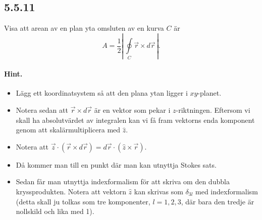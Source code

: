 \documentclass[%
oneside,                 %
final,                   %
10pt]{article}
\newenvironment{doconceexercise}{}{}
\newcounter{doconceexercisecounter}
\begin{document}
\begin{doconceexercise}

\subsection{5.5.11}

Visa att arean av en plan yta omsluten av en kurva $C$ är
\begin{equation*}
A=\frac{1}{2} \left| \,\oint\limits_C\vec{r}\times d\vec{r}\, \right|.
\end{equation*}


\paragraph{Hint.}
\begin{itemize}
\item Lägg ett koordinatsystem så att den plana ytan ligger i $xy$-planet.

\item Notera sedan att $\vec{r}\times d\vec{r}$ är en vektor som pekar i $z$-riktningen. Eftersom vi skall ha absolutvärdet av integralen kan vi få fram vektorns enda komponent genom att skalärmultiplicera med $\hat{z}$.

\item Notera att $\vec{z} \cdot (\vec{r}\times d\vec{r}) = d\vec{r} \cdot (\hat{z} \times \vec{r})$.

\item Då kommer man till en punkt där man kan utnyttja Stokes sats. 

\item Sedan får man utnyttja indexformalism för att skriva om den dubbla kryssprodukten. Notera att vektorn $\hat{z}$ kan skrivas som $\delta_{3l}$ med indexformalism (detta skall ju tolkas som tre komponenter, $l=1,2,3$, där bara den tredje är nollskild och lika med 1).
\end{itemize}

\noindent

\end{doconceexercise}



\end{document}
